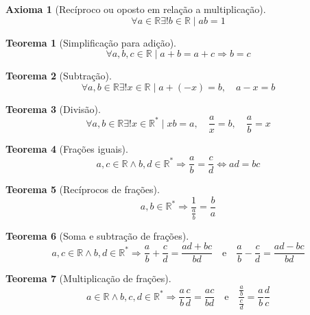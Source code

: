 \documentclass[
]{book}
\newtheorem{theorem}{Teorema}[chapter]
\newtheorem{proposition}{Axioma}[chapter]
\theoremstyle{definition}
\theoremstyle{definition}
\theoremstyle{definition}
\theoremstyle{definition}
\theoremstyle{remark}
\begin{document}
\begin{proposition}[Recíproco ou oposto em relação a multiplicação]
\protect\hypertarget{prp:irreciproco}{}\label{prp:irreciproco}\[
\forall a \in \mathbb{R} \exists!  b \in \mathbb{R} \mid ab = 1
\]
\end{proposition}

\begin{theorem}[Simplificação para adição]
\protect\hypertarget{thm:thmsimpladd}{}\label{thm:thmsimpladd}\[
\forall a,b,c \in \mathbb{R} \mid a+b=a+c \Rightarrow b = c
\]
\end{theorem}

\begin{theorem}[Subtração]
\protect\hypertarget{thm:thmsubtr}{}\label{thm:thmsubtr}\[
\forall a,b \in \mathbb{R} \exists! x \in \mathbb{R} \mid a + (-x) = b, \quad a-x=b 
\]
\end{theorem}

\begin{theorem}[Divisão]
\protect\hypertarget{thm:thmdiv}{}\label{thm:thmdiv}\[
\forall a,b \in \mathbb{R} \exists! x \in \mathbb{R}^* \mid xb = a, \quad \frac{a}{x}=b, \quad \frac{a}{b} = x 
\]
\end{theorem}

\begin{theorem}[Frações iguais]
\protect\hypertarget{thm:thmfrceq}{}\label{thm:thmfrceq}\[
a,c \in \mathbb{R} \wedge b,d \in \mathbb{R}^* 
\Rightarrow
\frac{a}{b} = \frac{c}{d} \Leftrightarrow ad = bc 
\]
\end{theorem}

\begin{theorem}[Recíprocos de frações]
\protect\hypertarget{thm:thmfracinv}{}\label{thm:thmfracinv}\[
a, b \in \mathbb{R}^* \Rightarrow \frac{1}{\frac{a}{b}} = \frac{b}{a}
\]
\end{theorem}

\begin{theorem}[Soma e subtração de frações]
\protect\hypertarget{thm:thmfracsum}{}\label{thm:thmfracsum}\[
a,c \in \mathbb{R} \wedge b,d \in \mathbb{R}^* 
\Rightarrow
\frac{a}{b} + \frac{c}{d} = \frac{ad + bc}{bd} 
\quad \text{e} \quad 
\frac{a}{b} - \frac{c}{d} = \frac{ad - bc}{bd}
\]
\end{theorem}

\begin{theorem}[Multiplicação de frações]
\protect\hypertarget{thm:thmfracmult}{}\label{thm:thmfracmult}\[
a \in \mathbb{R} \wedge b,c,d \in \mathbb{R}^* 
\Rightarrow
\frac{a}{b}\frac{c}{d} = \frac{ac}{bd} 
\quad \text{e} \quad
\frac{\frac{a}{b}}{\frac{c}{d}} = \frac{a}{b} \frac{d}{c}
\]
\end{theorem}
\end{document}
